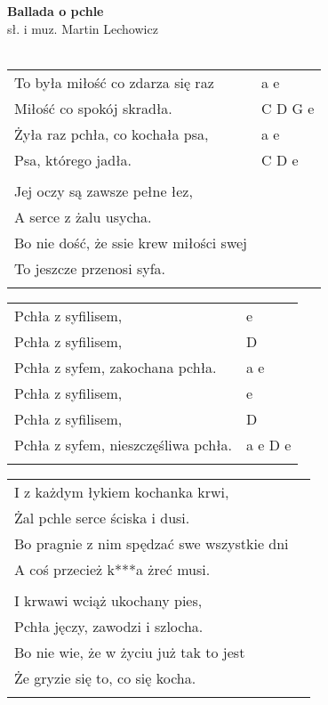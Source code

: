 \documentclass[a5paper]{article}
\begin{document}


\noindent
\fontsize{12pt}{15pt}\selectfont
\textbf{Ballada o pchle} \\
\fontsize{8pt}{10pt}\selectfont
sł. i muz. Martin Lechowicz \\ \\
\fontsize{10pt}{12pt}\selectfont
{}
\begin{tabular}{@{}p{8.5cm}p{3cm}@{}}
\noindent
To była miłość co zdarza się raz & a e \\
Miłość co spokój skradła. & C D G e \\
Żyła raz pchła, co kochała psa, & a e \\
Psa, którego jadła. & C D e \\ \\

Jej oczy są zawsze pełne łez, \\
A serce z żalu usycha. \\
Bo nie dość, że ssie krew miłości swej \\
To jeszcze przenosi syfa. \\ \\
\end{tabular}

\noindent
\begin{tabular}{@{}p{7.5cm}p{3cm}@{}}
Pchła z syfilisem, & e \\
Pchła z syfilisem, & D \\
Pchła z syfem, zakochana pchła. & a e \\

Pchła z syfilisem, & e \\
Pchła z syfilisem, & D \\
Pchła z syfem, nieszczęśliwa pchła. & a e D e \\ \\
\end{tabular}

\noindent
\begin{tabular}{@{}p{8.5cm}p{3cm}@{}}
I z każdym łykiem kochanka krwi, \\
Żal pchle serce ściska i dusi. \\
Bo pragnie z nim spędzać swe wszystkie dni \\
A coś przecież k***a żreć musi. \\ \\

I krwawi wciąż ukochany pies, \\
Pchła jęczy, zawodzi i szlocha. \\
Bo nie wie, że w życiu już tak to jest \\
Że gryzie się to, co się kocha. \\ \\
\end{tabular}
\end{document}
